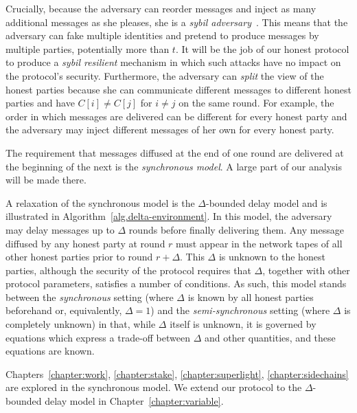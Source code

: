 Crucially, because the adversary can reorder messages and inject as many
additional messages as she pleases, she is a
\emph{sybil adversary}~\cite{sybil}. This means that the adversary can fake
multiple identities and pretend to produce messages by multiple parties,
potentially more than $t$. It will be the job of our honest protocol to produce
a \emph{sybil resilient} mechanism in which such attacks have no impact on the
protocol's security. Furthermore, the adversary can \emph{split} the view of the
honest parties because she can communicate different messages to different
honest parties and have $C[i] \neq C[j]$ for $i \neq j$ on the same round. For example, the order in which messages are delivered can be
different for every honest party and the adversary may inject different messages
of her own for every honest party.

The requirement that messages diffused at the end of one round are delivered at
the beginning of the next is the \emph{synchronous model}. A
large part of our analysis will be made there.



A relaxation of the synchronous model is the $\Delta$-bounded
delay model and is illustrated in Algorithm~\ref{alg.delta-environment}. In this model, the adversary may
delay messages up to $\Delta$ rounds before finally delivering them. Any message
diffused by any honest party at round $r$ must appear in the network tapes of
all other honest parties prior to round $r + \Delta$. This $\Delta$ is unknown
to the honest parties, although the security of the protocol requires that
$\Delta$, together with other protocol parameters, satisfies a number of
conditions. As such, this model stands between the \emph{synchronous} setting
(where $\Delta$ is known by all honest parties beforehand or, equivalently,
$\Delta = 1$) and the \emph{semi-synchronous} setting (where $\Delta$ is
completely unknown) in that, while $\Delta$ itself is unknown, it is governed by
equations which express a trade-off between $\Delta$ and other quantities, and
these equations are known.

Chapters~\ref{chapter:work},
\ref{chapter:stake}, \ref{chapter:superlight}, \ref{chapter:sidechains} are
explored in the synchronous model. We extend our protocol to the $\Delta$-bounded
delay model in Chapter~\ref{chapter:variable}.

